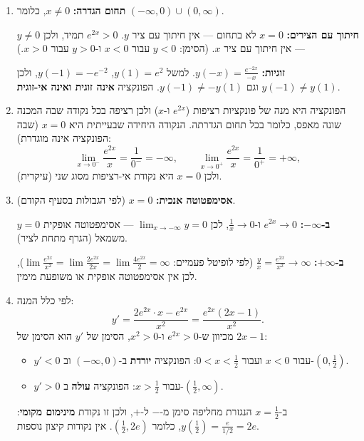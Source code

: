 \begin{solution}
\begin{enumerate}
  \item \textbf{תחום הגדרה:} $x\neq0$, כלומר $(-\infty,0)\cup(0,\infty)$.

  \textbf{חיתוך עם הצירים:} $x=0$ לא בתחום — אין חיתוך עם ציר $y$. $e^{2x}>0$ תמיד, ולכן $y\ne0$ — אין חיתוך עם ציר $x$. (הסימן: $y<0$ עבור $x<0$ ו-$y>0$ עבור $x>0$.)

  \textbf{זוגיות:} $y(-x)=\frac{e^{-2x}}{-x}$. למשל $y(1)=e^2$, $y(-1)=-e^{-2}$, ולכן $y(-1)\ne y(1)$ וגם $y(-1)\ne -y(1)$. הפונקציה \textbf{אינה זוגית ואינה אי-זוגית}.

  \item הפונקציה היא מנה של פונקציות רציפות ($e^{2x}$ ו-$x$) ולכן רציפה בכל נקודה שבה המכנה שונה מאפס, כלומר בכל תחום הגדרתה. הנקודה היחידה שבעייתית היא $x=0$ (שבה הפונקציה אינה מוגדרת):
  \[ \lim_{x\to0^-}\frac{e^{2x}}{x}=\frac{1}{0^-}=-\infty,\qquad \lim_{x\to0^+}\frac{e^{2x}}{x}=\frac{1}{0^+}=+\infty, \]
  ולכן $x=0$ היא נקודת אי-רציפות מסוג שני (עיקרית).

  \item \textbf{אסימפטוטה אנכית:} $x=0$ (לפי הגבולות בסעיף הקודם).

  \textbf{ב-$-\infty$:} $e^{2x}\to0$ ו-$\frac1x\to0$, לכן $\lim_{x\to-\infty}y=0$ — אסימפטוטה אופקית $y=0$ משמאל (הגרף מתחת לציר).

  \textbf{ב-$+\infty$:} $\frac{y}{x}=\frac{e^{2x}}{x^2}\to\infty$ (לפי לופיטל פעמיים: $\lim\frac{e^{2x}}{x^2}=\lim\frac{2e^{2x}}{2x}=\lim\frac{4e^{2x}}{2}=\infty$), לכן אין אסימפטוטה אופקית או משופעת מימין.

  \item לפי כלל המנה:
  \[ y'=\frac{2e^{2x}\cdot x - e^{2x}}{x^2} = \frac{e^{2x}(2x-1)}{x^2}. \]
  מכיוון ש-$e^{2x}>0$ ו-$x^2>0$, הסימן של $y'$ הוא הסימן של $2x-1$:
  \begin{itemize}
    \item $y'<0$ עבור $x<0$ ועבור $0<x<\frac12$: הפונקציה \textbf{יורדת} ב-$(-\infty,0)$ וב-$(0,\frac12)$.
    \item $y'>0$ עבור $x>\frac12$: הפונקציה \textbf{עולה} ב-$(\frac12,\infty)$.
  \end{itemize}
  ב-$x=\frac12$ הנגזרת מחליפה סימן מ-$-$ ל-$+$, ולכן זו נקודת \textbf{מינימום מקומי}: $y(\tfrac12)=\frac{e}{1/2}=2e$, כלומר $(\frac12,2e)$. אין נקודות קיצון נוספות.


\end{enumerate}
\end{solution}
